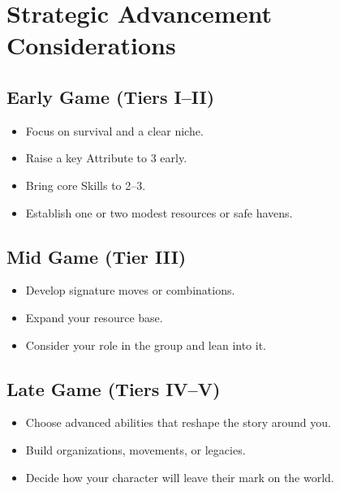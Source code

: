 \section{Strategic Advancement Considerations}
\label{sec:advancement-strategy}

\subsection{Early Game (Tiers I--II)}
\label{sec:early-game}
\begin{itemize}
  \item Focus on survival and a clear niche.
  \item Raise a key Attribute to 3 early.
  \item Bring core Skills to 2--3.
  \item Establish one or two modest resources or safe havens.
\end{itemize}

\subsection{Mid Game (Tier III)}
\label{sec:mid-game}
\begin{itemize}
  \item Develop signature moves or combinations.
  \item Expand your resource base.
  \item Consider your role in the group and lean into it.
\end{itemize}

\subsection{Late Game (Tiers IV--V)}
\label{sec:late-game}
\begin{itemize}
  \item Choose advanced abilities that reshape the story around you.
  \item Build organizations, movements, or legacies.
  \item Decide how your character will leave their mark on the world.
\end{itemize}

